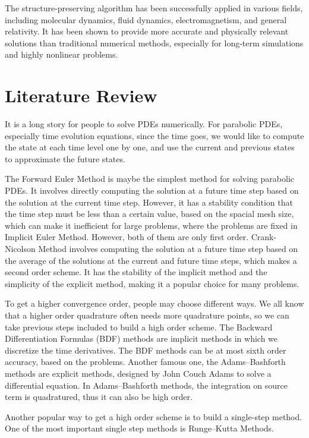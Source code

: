 The structure-preserving algorithm has been successfully applied in various fields, including molecular dynamics, fluid dynamics, electromagnetism, and general relativity. It has been shown to provide more accurate and physically relevant solutions than traditional numerical methods, especially for long-term simulations and highly nonlinear problems.

\section{Literature Review}

It is a long story for people to solve PDEs numerically. 
For parabolic PDEs, especially time evolution equations, 
since the time goes, we would like to compute the state at each time level one by one, 
and use the current and previous states to approximate the future states. 

The Forward Euler Method is maybe the simplest method for solving parabolic PDEs. It involves directly computing the solution at a future time step based on the solution at the current time step. However, it has a stability condition that the time step must be less than a certain value, based on the spacial mesh size, which can make it inefficient for large problems, 
where the problems are fixed in Implicit Euler Method. 
However, both of them are only first order. 
Crank-Nicolson Method involves computing 
the solution at a future time step based on the average 
of the solutions at the current and future time steps, 
which makes a second order scheme. 
It has the stability of the implicit method and the simplicity 
of the explicit method, making it a popular choice for many problems.

To get a higher convergence order, people may choose different ways. 
We all know that a higher order quadrature often needs more quadrature points, 
so we can take previous steps included to build a high order scheme. 
The Backward Differentiation Formulas (BDF) methods are implicit methods 
in which we discretize the time derivatives. The BDF methods 
can be at most sixth order accuracy, based on the problems. 
Another famous one, the Adams--Bashforth methods are explicit methods, 
designed by John Couch Adams to solve a differential equation. 
In Adams--Bashforth methods, 
the integration on source term is quadratured, thus it can also be high order. 

Another popular way to get a high order scheme is to build a single-step method. 
One of the most important single step methods is Runge--Kutta Methods. 

